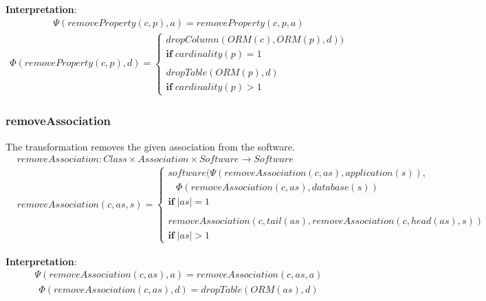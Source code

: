 \documentclass[10pt]{article}
\begin{document}
\noindent \textbf{Interpretation}:
\begin{align}
\Psi(removeProperty(c, p), a) = removeProperty(c, p, a)
\end{align}
\begin{align}
\Phi(removeProperty(c, p), d) = \begin{cases}
 dropColumn(ORM(c), ORM(p), d)) \\ \mathbf{if} \; cardinality(p) = 1  \\\\ 
 dropTable(ORM(p), d) \\ \mathbf{if} \; cardinality(p) > 1 
 \end{cases}
\end{align}

\subsubsection{removeAssociation}
The transformation removes the given association from the software.
\begin{align}
& removeAssociation: Class \times Association \times Software \rightarrow Software \nonumber \\
& removeAssociation(c, as, s) = \begin{cases}
   software(\Psi( removeAssociation(c, as), application(s)), \\ 
    \;\;\; \Phi(removeAssociation(c, as), database(s)) \\
     \mathbf{if} \; |as| = 1 \\\\
   removeAssociation(c, tail(as), removeAssociation(c, head(as), s)) \\
     \mathbf{if} \; |as| > 1 
 \end{cases}
\end{align}

\noindent \textbf{Interpretation}:
\begin{align}
\Psi(removeAssociation(c, as), a) = removeAssociation(c, as, a)
\end{align}
\begin{align}
\Phi(removeAssociation(c, as), d) = dropTable(ORM(as), d)
\end{align}

\end{document}
